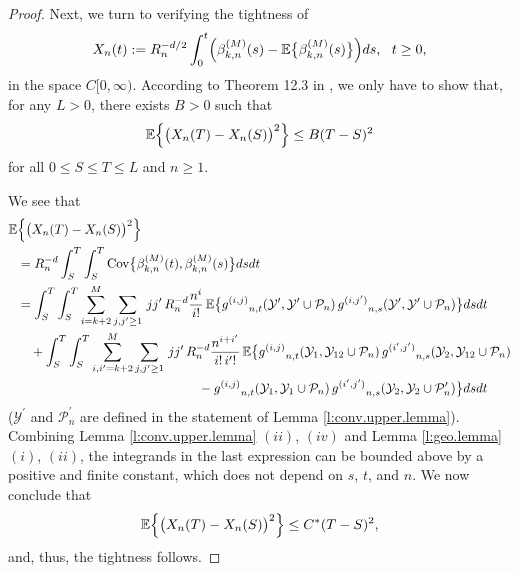 \documentclass[11pt]{amsart}
\numberwithin{equation}{section}
\theoremstyle{plain}
\theoremstyle{definition}
\begin{document}
\begin{proof}
Next, we turn to verifying the tightness of
$$
X_n(t) := R_n^{-d/2} \int_0^t \Bigl( \beta_{k,n}^{(M)}(s) - {\mathbb{E}} \bigl\{ \beta_{k,n}^{(M)}(s) \bigr\} \Bigr)ds, \ \ t \geq 0,
$$
in the space $C[0,\infty)$. According to Theorem 12.3 in \cite{billingsley:1968}, we only have to show that, for any $L>0$, there exists $B>0$ such that
$$
{\mathbb{E}} \Bigl\{\bigl( X_n(T) - X_n(S)\bigr)^2 \Bigr\} \leq B (T-S)^2
$$
for all $0\leq S \leq T\leq L$ and $n\geq1$.

We see that
\begin{align*}
{\mathbb{E}} &\Bigl\{\bigl( X_n(T) - X_n(S)\bigr)^2 \Bigr\}  \\
&=R_n^{-d} \int_S^T\int_S^T \text{Cov} \bigl\{ \beta_{k,n}^{(M)}(t), \beta_{k,n}^{(M)}(s) \bigr\} ds dt \\
&= \int_S^T\int_S^T \sum_{i = k+2}^M \sum_{j, {j^{\prime}} \geq 1} \, j {j^{\prime}}\,  R_n^{-d}  \frac{n^{i}}{i!}\, {\mathbb{E}} \bigl\{ {g^{(i,j)}}_{n,t}({{\mathcal{Y}^{\prime}}}, {{\mathcal{Y}^{\prime}}} \cup {\mathcal P_n})\, {g^{(i,j^{\prime})}}_{n,s} ({{\mathcal{Y}^{\prime}}}, {{\mathcal{Y}^{\prime}}} \cup {\mathcal P_n}) \bigr\} ds dt \\
&\quad + \int_S^T\int_S^T \sum_{i, {i^{\prime}} = k+2}^M \sum_{j, {j^{\prime}} \geq1} \, j {j^{\prime}}\,  R_n^{-d}  \frac{n^{i+{i^{\prime}}}}{i!\, {i^{\prime}}!}\, {\mathbb{E}} \bigl\{ {g^{(i,j)}}_{n,t}({{\mathcal{Y}}}_1, {{\mathcal{Y}}}_{12} \cup {\mathcal P_n})\, {g^{(i^{\prime},j^{\prime})}}_{n,s} ({{\mathcal{Y}}}_2, {{\mathcal{Y}}}_{12} \cup {\mathcal P_n}) \\
&\qquad \qquad \qquad \qquad \qquad \qquad \qquad  - {g^{(i,j)}}_{n,t}({{\mathcal{Y}}}_1, {{\mathcal{Y}}}_1 \cup {\mathcal P_n})\, {g^{(i^{\prime},j^{\prime})}}_{n,s} ({{\mathcal{Y}}}_2, {{\mathcal{Y}}}_2 \cup {\mathcal P_n^{\prime}}) \bigr\}dsdt
\end{align*}
(${{\mathcal{Y}^{\prime}}}$ and ${\mathcal P_n^{\prime}}$ are defined in the statement of Lemma \ref{l:conv.upper.lemma}). \\
Combining Lemma \ref{l:conv.upper.lemma} $(ii)$, $(iv)$ and Lemma \ref{l:geo.lemma} $(i)$, $(ii)$, the integrands in the last expression can be bounded above by a positive and finite constant, which does not depend on $s$, $t$, and $n$. We now conclude that
$$
{\mathbb{E}} \Bigl\{\bigl( X_n(T) - X_n(S)\bigr)^2 \Bigr\} \leq C^* (T-S)^2,
$$
and, thus, the tightness follows.
\end{proof}
\end{document}

